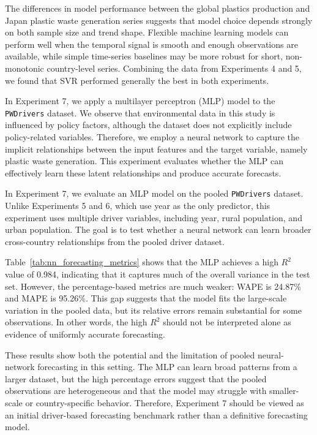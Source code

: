 The differences in model performance between the global plastics production and Japan plastic waste generation series suggests that model choice depends strongly on both sample size and trend shape. Flexible machine learning models can perform well when the temporal signal is smooth and enough observations are available, while simple time-series baselines may be more robust for short, non-monotonic country-level series. Combining the data from Experiments 4 and 5, we found that SVR performed generally the best in both experiments.


In Experiment 7, we apply a multilayer perceptron (MLP) model to the \texttt{PWDrivers} dataset. We observe that environmental data in this study is influenced by policy factors, although the dataset does not explicitly include policy-related variables. Therefore, we employ a neural network to capture the implicit relationships between the input features and the target variable, namely plastic waste generation. This experiment evaluates whether the MLP can effectively learn these latent relationships and produce accurate forecasts.

In Experiment 7, we evaluate an MLP model on the pooled \texttt{PWDrivers} dataset. Unlike Experiments 5 and 6, which use year as the only predictor, this experiment uses multiple driver variables, including year, rural population, and urban population. The goal is to test whether a neural network can learn broader cross-country relationships from the pooled driver dataset.



Table~\ref{tab:nn_forecasting_metrics} shows that the MLP achieves a high \(R^2\) value of 0.984, indicating that it captures much of the overall variance in the test set. However, the percentage-based metrics are much weaker: WAPE is 24.87\% and MAPE is 95.26\%. This gap suggests that the model fits the large-scale variation in the pooled data, but its relative errors remain substantial for some observations. In other words, the high \(R^2\) should not be interpreted alone as evidence of uniformly accurate forecasting.

These results show both the potential and the limitation of pooled neural-network forecasting in this setting. The MLP can learn broad patterns from a larger dataset, but the high percentage errors suggest that the pooled observations are heterogeneous and that the model may struggle with smaller-scale or country-specific behavior. Therefore, Experiment 7 should be viewed as an initial driver-based forecasting benchmark rather than a definitive forecasting model.

